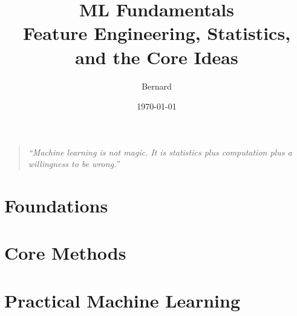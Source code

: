 \documentclass[11pt,a4paper]{book}
\theoremstyle{definition}
\theoremstyle{plain}
\begin{document}
\title{\Huge\textbf{ML Fundamentals}\\[0.5cm]
	\large Feature Engineering, Statistics, and the Core Ideas}
\author{Bernard}
\date{\today}
\maketitle
\thispagestyle{empty}

\vfill
\begin{quote}
	\emph{``Machine learning is not magic. It is statistics plus computation plus a willingness to be wrong.''}
\end{quote}
\vfill

\newpage
\tableofcontents
\newpage

\part{Foundations}




\part{Core Methods}





\part{Practical Machine Learning}




\newpage


\end{document}
